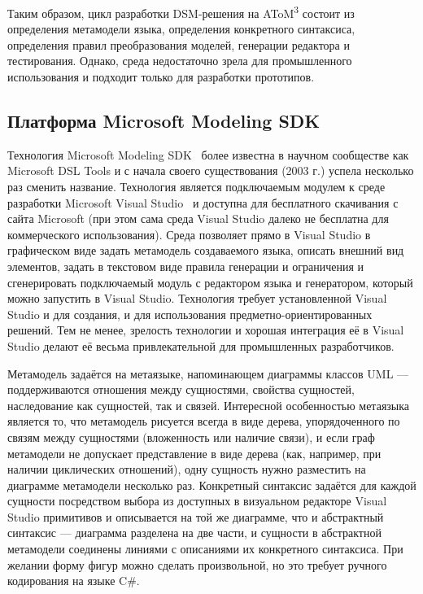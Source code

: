 Таким образом, цикл разработки \ac{DSM}-решения на AToM\textsuperscript{3} состоит из определения метамодели 
языка, определения конкретного синтаксиса, определения правил преобразования моделей, 
генерации редактора и тестирования. Однако, среда недостаточно зрела для промышленного 
использования и подходит только для разработки прототипов.

\subsection{Платформа Microsoft Modeling SDK}
Технология Microsoft Modeling SDK~\cite{cook2007domain} более известна в научном сообществе как Microsoft DSL Tools
и с начала своего существования (2003 г.) успела несколько раз сменить название. Технология является
подключаемым модулем к среде разработки Microsoft Visual Studio~\cite{visualStudio}
и доступна для бесплатного скачивания с сайта Microsoft (при этом сама среда Visual Studio далеко не 
бесплатна для коммерческого использования). Среда позволяет прямо в Visual Studio
в графическом виде задать метамодель создаваемого языка, описать внешний вид элементов, 
задать в текстовом виде правила генерации и ограничения и сгенерировать подключаемый модуль с
редактором языка и генератором, который можно запустить в Visual Studio. Технология требует установленной 
Visual Studio и для создания, и для использования предметно-ориентированных решений.
Тем не менее, зрелость технологии и хорошая интеграция её в Visual Studio делают её
весьма привлекательной для промышленных разработчиков.

Метамодель задаётся на метаязыке, напоминающем диаграммы классов UML --- поддерживаются
отношения между сущностями, свойства сущностей, наследование как сущностей, так и связей.
Интересной особенностью метаязыка является то, что метамодель рисуется всегда в виде дерева,
упорядоченного по связям между сущностями (вложенность или наличие связи), и если граф метамодели
не допускает представление в виде дерева (как, например, при наличии циклических отношений),
одну сущность нужно разместить на диаграмме метамодели несколько раз. Конкретный синтаксис
задаётся для каждой сущности посредством выбора из доступных в визуальном редакторе Visual Studio
примитивов и описывается на той же диаграмме, что и абстрактный синтаксис --- диаграмма
разделена на две части, и сущности в абстрактной метамодели соединены линиями с описаниями их конкретного синтаксиса.
При желании форму фигур можно сделать произвольной, но это требует ручного кодирования на языке C\#.


